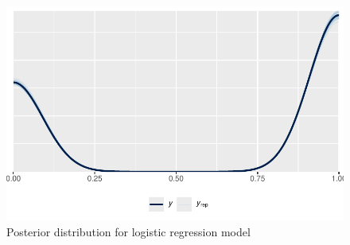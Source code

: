 \documentclass[
  letterpaper,
  DIV=11,
  numbers=noendperiod]{scrartcl}
\begin{document}
\begin{figure}

{\centering \includegraphics{paper_files/figure-pdf/fig-post_dist-1.pdf}

}

\caption{\label{fig-post_dist}Posterior distribution for logistic
regression model}

\end{figure}
\end{document}
